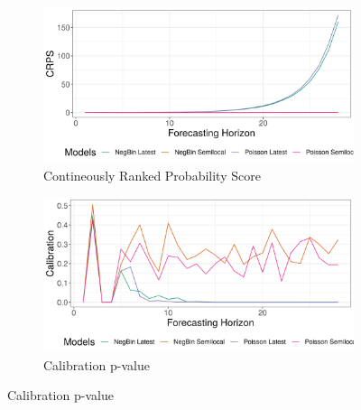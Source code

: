 \begin{figure}[H]
\begin{subfigure}{0.5\textwidth}
  \centering
  \includegraphics[width=\linewidth]{../output/Nyiragongo_crps.png}  
  \caption{Contineously Ranked Probability Score}
  \label{fig:sub-first}
\end{subfigure}
\begin{subfigure}{0.5\textwidth}
  \centering
  \includegraphics[width=\linewidth]{../output/Nyiragongo_calibration.png}  
  \caption{Calibration p-value}
  \label{fig:sub-second}
\end{subfigure}


\end{figure}
